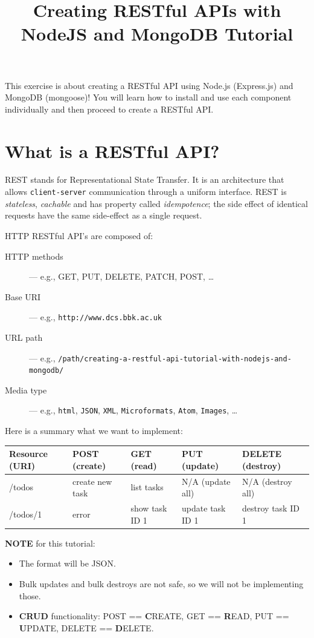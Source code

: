 \documentclass[12pt]{article}
\title{Creating RESTful APIs with NodeJS and MongoDB Tutorial}
\author{}
\date{}
\begin{document}
\maketitle

This exercise is about creating a RESTful API using Node.js (Express.js)
and MongoDB (mongoose)! You will learn how to install and use
each component individually and then proceed to create a RESTful API.

\section{What is a RESTful API?}

REST stands for Representational State Transfer. It is an architecture
that allows \texttt{client-server} communication through a uniform
interface. REST is \emph{stateless}, \emph{cachable} and has
property called \emph{idempotence}; the side effect of
identical requests have the same side-effect as a single request.

HTTP RESTful API's are composed of:
\begin{description}
\item[HTTP methods] --- e.g., GET, PUT, DELETE, PATCH, POST, \ldots{}
\item[Base URI] --- e.g., \texttt{http://www.dcs.bbk.ac.uk}
\item[URL path] --- e.g., \texttt{/path/creating-a-restful-api-tutorial-with-nodejs-and-mongodb/}
\item[Media type] --- e.g., \texttt{html}, \texttt{JSON}, \texttt{XML},
  \texttt{Microformats}, \texttt{Atom}, \texttt{Images}, \ldots{}
\end{description}

\noindent Here is a summary what we want to implement:
\begin{longtable}[]{@{}lllll@{}}
\toprule
Resource (URI) & POST (create) & GET (read) & PUT (update) & DELETE
(destroy)\tabularnewline
\midrule
\endhead
/todos & create new task & list tasks & N/A (update all) & N/A (destroy
all)\tabularnewline
/todos/1 & error & show task ID 1 & update task ID 1 & destroy task ID
1\tabularnewline
\bottomrule
\end{longtable}
\textbf{NOTE} for this tutorial:
\begin{itemize}
\item
  The format will be JSON.
\item
  Bulk updates and bulk destroys are not safe, so we will not be implementing those.
\item
  \textbf{CRUD} functionality: POST == \textbf{C}REATE, GET ==
  \textbf{R}EAD, PUT == \textbf{U}PDATE, DELETE == \textbf{D}ELETE.
\end{itemize}
\end{document}
